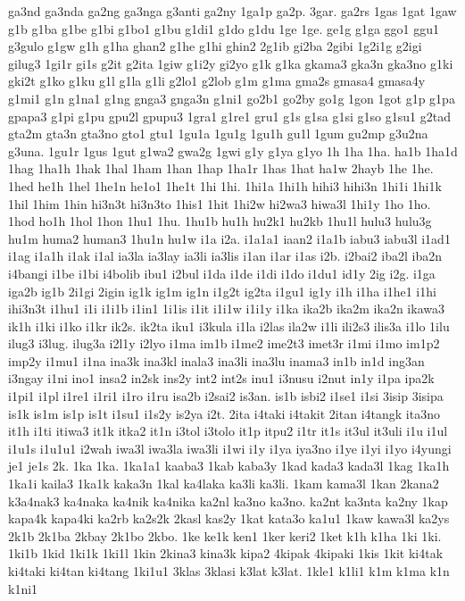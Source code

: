 {ga3nd
ga3nda
ga2ng
ga3nga
g3anti
ga2ny
1ga1p
ga2p.
3gar.
ga2rs
1gas
1gat
1gaw
g1b
g1ba
g1be
g1bi
g1bo1
g1bu
g1di1
g1do
g1du
1ge
1ge.
ge1g
g1ga
ggo1
ggu1
g3gulo
g1gw
g1h
g1ha
ghan2
g1he
g1hi
ghin2
2g1ib
gi2ba
2gibi
1g2i1g
g2igi
gilug3
1gi1r
gi1s
g2it
g2ita
1giw
g1i2y
gi2yo
g1k
g1ka
gkama3
gka3n
gka3no
g1ki
gki2t
g1ko
g1ku
g1l
g1la
g1li
g2lo1
g2lob
g1m
g1ma
gma2s
gmasa4
gmasa4y
g1mi1
g1n
g1na1
g1ng
gnga3
gnga3n
g1ni1
go2b1
go2by
go1g
1gon
1got
g1p
g1pa
gpapa3
g1pi
g1pu
gpu2l
gpupu3
1gra1
g1re1
gru1
g1s
g1sa
g1si
g1so
g1su1
g2tad
gta2m
gta3n
gta3no
gto1
gtu1
1gu1a
1gu1g
1gu1h
gu1l
1gum
gu2mp
g3u2na
g3una.
1gu1r
1gus
1gut
g1wa2
gwa2g
1gwi
g1y
g1ya
g1yo
1h
1ha
1ha.
ha1b
1ha1d
1hag
1ha1h
1hak
1hal
1ham
1han
1hap
1ha1r
1has
1hat
ha1w
2hayb
1he
1he.
1hed
he1h
1hel
1he1n
he1o1
1he1t
1hi
1hi.
1hi1a
1hi1h
hihi3
hihi3n
1hi1i
1hi1k
1hil
1him
1hin
hi3n3t
hi3n3to
1his1
1hit
1hi2w
hi2wa3
hiwa3l
1hi1y
1ho
1ho.
1hod
ho1h
1hol
1hon
1hu1
1hu.
1hu1b
hu1h
hu2k1
hu2kb
1hu1l
hulu3
hulu3g
hu1m
huma2
human3
1hu1n
hu1w
i1a
i2a.
i1a1a1
iaan2
i1a1b
iabu3
iabu3l
i1ad1
i1ag
i1a1h
i1ak
i1al
ia3la
ia3lay
ia3li
ia3lis
i1an
i1ar
i1as
i2b.
i2bai2
iba2l
iba2n
i4bangi
i1be
i1bi
i4bolib
ibu1
i2bul
i1da
i1de
i1di
i1do
i1du1
id1y
2ig
i2g.
i1ga
iga2b
ig1b
2i1gi
2igin
ig1k
ig1m
ig1n
i1g2t
ig2ta
i1gu1
ig1y
i1h
i1ha
i1he1
i1hi
ihi3n3t
i1hu1
i1i
i1i1b
i1in1
1i1is
i1it
i1i1w
i1i1y
i1ka
ika2b
ika2m
ika2n
ikawa3
ik1h
i1ki
i1ko
i1kr
ik2s.
ik2ta
iku1
i3kula
i1la
i2las
ila2w
i1li
ili2s3
ilis3a
i1lo
1ilu
ilug3
i3lug.
ilug3a
i2l1y
i2lyo
i1ma
im1b
i1me2
ime2t3
imet3r
i1mi
i1mo
im1p2
imp2y
i1mu1
i1na
ina3k
ina3kl
inala3
ina3li
ina3lu
inama3
in1b
in1d
ing3an
i3ngay
i1ni
ino1
insa2
in2sk
ins2y
int2
int2s
inu1
i3nusu
i2nut
in1y
i1pa
ipa2k
i1pi1
i1pl
i1re1
i1ri1
i1ro
i1ru
isa2b
i2sai2
is3an.
is1b
isbi2
i1se1
i1si
3isip
3isipa
is1k
is1m
is1p
is1t
i1su1
i1s2y
is2ya
i2t.
2ita
i4taki
i4takit
2itan
i4tangk
ita3no
it1h
i1ti
itiwa3
it1k
itka2
it1n
i3tol
i3tolo
it1p
itpu2
i1tr
it1s
it3ul
it3uli
i1u
i1ul
i1u1s
i1u1u1
i2wah
iwa3l
iwa3la
iwa3li
i1wi
i1y
i1ya
iya3no
i1ye
i1yi
i1yo
i4yungi
je1
je1s
2k.
1ka
1ka.
1ka1a1
kaaba3
1kab
kaba3y
1kad
kada3
kada3l
1kag
1ka1h
1ka1i
kaila3
1ka1k
kaka3n
1kal
ka4laka
ka3li
ka3li.
1kam
kama3l
1kan
2kana2
k3a4nak3
ka4naka
ka4nik
ka4nika
ka2nl
ka3no
ka3no.
ka2nt
ka3nta
ka2ny
1kap
kapa4k
kapa4ki
ka2rb
ka2s2k
2kasl
kas2y
1kat
kata3o
ka1u1
1kaw
kawa3l
ka2ys
2k1b
2k1ba
2kbay
2k1bo
2kbo.
1ke
ke1k
ken1
1ker
keri2
1ket
k1h
k1ha
1ki
1ki.
1ki1b
1kid
1ki1k
1ki1l
1kin
2kina3
kina3k
kipa2
4kipak
4kipaki
1kis
1kit
ki4tak
ki4taki
ki4tan
ki4tang
1ki1u1
3klas
3klasi
k3lat
k3lat.
1kle1
k1li1
k1m
k1ma
k1n
k1ni1
}
